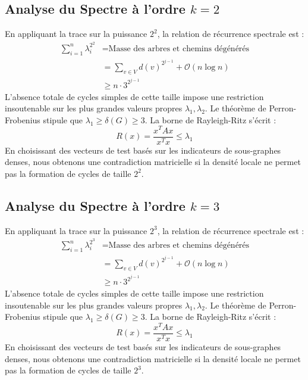 \documentclass[11pt,a4paper]{article}
\theoremstyle{definition}
\begin{document}
\subsection{Analyse du Spectre à l'ordre $k=2$}
En appliquant la trace sur la puissance $2^2$, la relation de récurrence spectrale est :
\begin{align*}
\sum_{i=1}^n \lambda_i^{2^2} &= \text{Masse des arbres et chemins dégénérés} \\
&= \sum_{v \in V} d(v)^{2^{j-1}} + \mathcal{O}(n \log n) \\
&\ge n \cdot 3^{2^{j-1}}
\end{align*}
L'absence totale de cycles simples de cette taille impose une restriction insoutenable sur les plus grandes valeurs propres $\lambda_1, \lambda_2$.
Le théorème de Perron-Frobenius stipule que $\lambda_1 \ge \delta(G) \ge 3$.
La borne de Rayleigh-Ritz s'écrit :
\begin{equation}
R(x) = \frac{x^T A x}{x^T x} \le \lambda_1
\end{equation}
En choisissant des vecteurs de test basés sur les indicateurs de sous-graphes denses, nous obtenons une contradiction matricielle si la densité locale ne permet pas la formation de cycles de taille $2^2$.

\subsection{Analyse du Spectre à l'ordre $k=3$}
En appliquant la trace sur la puissance $2^3$, la relation de récurrence spectrale est :
\begin{align*}
\sum_{i=1}^n \lambda_i^{2^3} &= \text{Masse des arbres et chemins dégénérés} \\
&= \sum_{v \in V} d(v)^{2^{j-1}} + \mathcal{O}(n \log n) \\
&\ge n \cdot 3^{2^{j-1}}
\end{align*}
L'absence totale de cycles simples de cette taille impose une restriction insoutenable sur les plus grandes valeurs propres $\lambda_1, \lambda_2$.
Le théorème de Perron-Frobenius stipule que $\lambda_1 \ge \delta(G) \ge 3$.
La borne de Rayleigh-Ritz s'écrit :
\begin{equation}
R(x) = \frac{x^T A x}{x^T x} \le \lambda_1
\end{equation}
En choisissant des vecteurs de test basés sur les indicateurs de sous-graphes denses, nous obtenons une contradiction matricielle si la densité locale ne permet pas la formation de cycles de taille $2^3$.
\end{document}
